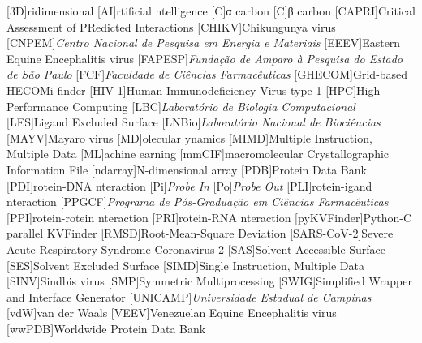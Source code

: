 \documentclass[Ingles]{phdthesis}
\begin{document}
\listoftables
\clearpage


\begin{acronym} \itemsep=-8pt
  [3D]{ridimensional}
  [AI]{rtificial ntelligence}
  [C\textalpha]{α carbon}
  [C\textbeta]{β carbon}
  [CAPRI]{Critical Assessment of PRedicted Interactions}
  [CHIKV]{Chikungunya virus}
  [CNPEM]{\textit{Centro Nacional de Pesquisa em Energia e Materiais}}
  [EEEV]{Eastern Equine Encephalitis virus}
  [FAPESP]{\textit{Fundação de Amparo à Pesquisa do Estado de São Paulo}}
  [FCF]{\textit{Faculdade de Ciências Farmacêuticas}}
  [GHECOM]{Grid-based HECOMi finder}
  [HIV-1]{Human Immunodeficiency Virus type 1}
  [HPC]{High-Performance Computing}
  [LBC]{\textit{Laboratório de Biologia Computacional}}
  [LES]{Ligand Excluded Surface}
  [LNBio]{\textit{Laboratório Nacional de Biociências}}
  [MAYV]{Mayaro virus}
  [MD]{olecular ynamics}
  [MIMD]{Multiple Instruction, Multiple Data}
  [ML]{achine earning}
  [mmCIF]{macromolecular Crystallographic Information File}
  [ndarray]{N-dimensional array}
  [PDB]{Protein Data Bank}
  [PDI]{rotein-DNA nteraction}
  [Pi]{\textit{Probe In}}
  [Po]{\textit{Probe Out}}
  [PLI]{rotein-igand nteraction}
  [PPGCF]{\textit{Programa de Pós-Graduação em Ciências Farmacêuticas}}
  [PPI]{rotein-rotein nteraction}
  [PRI]{rotein-RNA nteraction}
  [pyKVFinder]{Python-C parallel KVFinder}
  [RMSD]{Root-Mean-Square Deviation}
  [SARS-CoV-2]{Severe Acute Respiratory Syndrome Coronavirus 2}
  [SAS]{Solvent Accessible Surface}
  [SES]{Solvent Excluded Surface}
  [SIMD]{Single Instruction, Multiple Data}
  [SINV]{Sindbis virus}
  [SMP]{Symmetric Multiprocessing}
  [SWIG]{Simplified Wrapper and Interface Generator}
  [UNICAMP]{\textit{Universidade Estadual de Campinas}}
  [vdW]{van der Waals}
  [VEEV]{Venezuelan Equine Encephalitis virus}
  [wwPDB]{Worldwide Protein Data Bank}
\end{acronym}
\end{document}
